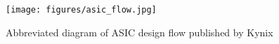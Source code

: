 
\begin{figure}[t]
    \centering
    \texttt{[image: figures/asic\_flow.jpg]}
    \caption{Abbreviated diagram of ASIC design flow published by Kynix \cite{kynixDesignFlow}}
    \label{fig:asic_flow}
\end{figure}
